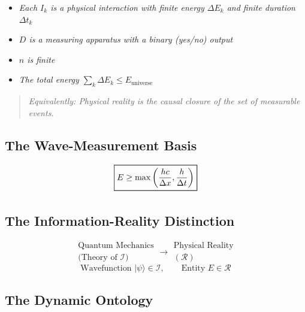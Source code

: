 \documentclass[aps,preprint,showpacs,showkeys]{revtex4}%
\begin{document}
\begin{itemize}
\item \emph{Each $I_k$ is a physical interaction with finite energy $\Delta
E_k$ and finite duration $\Delta t_k$}

\item \emph{$D$ is a measuring apparatus with a binary (yes/no) output}

\item \emph{$n$ is finite}

\item \emph{The total energy $\sum_k \Delta E_k \le E_{\text{universe}}$}
\end{itemize}

\begin{quote}
\emph{Equivalently: Physical reality is the causal closure of the set of
measurable events.}
\end{quote}

\subsection{The Wave-Measurement Basis}

\begin{equation}
\frame{\boxed{E \ge \max\left(\frac{hc}{\Delta x}, \frac{h}{\Delta t}\right)}%
}
\end{equation}

\subsection{The Information-Reality Distinction}

\begin{equation}
\boxed{ \begin{array}{c} \text{Quantum Mechanics} \\ \text{(Theory of }
\mathcal{I} \text{)} \end{array} \longrightarrow \begin{array}{c}
\text{Physical Reality} \\ (\mathcal{R}) \end{array} }
\end{equation}
\begin{equation}
\text{Wavefunction } |\psi\rangle \in \mathcal{I}, \qquad \text{Entity } E
\in \mathcal{R}
\end{equation}

\subsection{The Dynamic Ontology}
\end{document}
